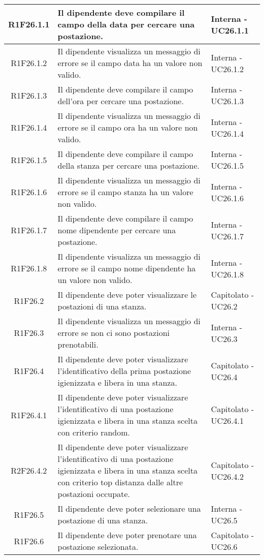 \begin{center}
\begin{longtable}{|c|p{10cm}|p{4cm}|}
		\hline
			R1F26.1.1&Il dipendente deve compilare il campo della data per cercare una postazione.	&Interna - UC26.1.1	\\
		\hline
			R1F26.1.2&Il dipendente visualizza un messaggio di errore se il campo data ha un valore non valido.	&Interna - UC26.1.2	\\
		\hline
			R1F26.1.3&Il dipendente deve compilare il campo dell'ora per cercare una postazione.	&Interna - UC26.1.3	\\
		\hline
			R1F26.1.4&Il dipendente visualizza un messaggio di errore se il campo ora ha un valore non valido.	&Interna - UC26.1.4	\\
		\hline
			R1F26.1.5&Il dipendente deve compilare il campo della stanza per cercare una postazione.		&Interna - UC26.1.5	\\
		\hline
			R1F26.1.6&Il dipendente visualizza un messaggio di errore se il campo stanza ha un valore non valido.	&Interna - UC26.1.6	\\
		\hline
			R1F26.1.7&Il dipendente deve compilare il campo nome dipendente per cercare una postazione.	&Interna - UC26.1.7	\\
		\hline
			R1F26.1.8&Il dipendente visualizza un messaggio di errore se il campo nome dipendente ha un valore non valido.	&Interna - UC26.1.8	\\
		\hline
		R1F26.2&Il dipendente deve poter visualizzare le postazioni di una stanza.	&Capitolato - UC26.2	\\
		\hline
			R1F26.3&Il dipendente visualizza un messaggio di errore se non ci sono postazioni prenotabili.	&Interna - UC26.3	\\
		\hline
		R1F26.4&Il dipendente deve poter visualizzare l'identificativo della prima postazione igienizzata e libera in una stanza.	&Capitolato - UC26.4	\\
		\hline
		R1F26.4.1&Il dipendente deve poter visualizzare l'identificativo di una postazione igienizzata e libera in una stanza scelta con criterio random.	&Capitolato - UC26.4.1	\\
		\hline
		R2F26.4.2&Il dipendente deve poter visualizzare l'identificativo di una postazione igienizzata e libera in una stanza scelta con criterio top distanza dalle altre postazioni occupate.	&Capitolato - UC26.4.2	\\
		\hline
		R1F26.5&Il dipendente deve poter selezionare una postazione di una stanza.	&Interna - UC26.5	\\
		\hline
		R1F26.6&Il dipendente deve poter prenotare una postazione selezionata.	&Capitolato - UC26.6	\\

\end{longtable}
\end{center}
